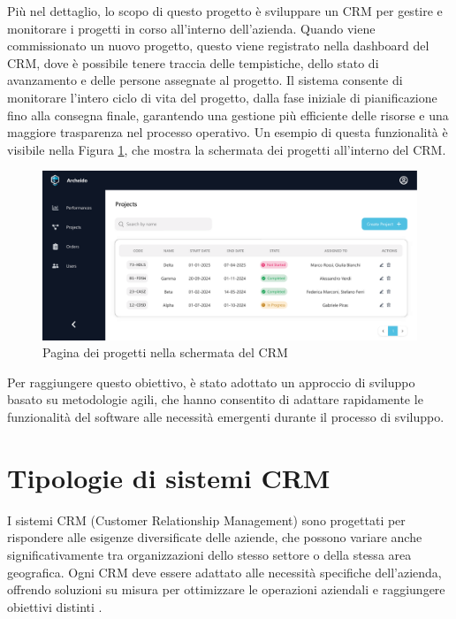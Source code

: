 \documentclass[target=bach,aauheader=,style=]{thud}
\begin{document}
\noindent  Più nel dettaglio, lo scopo di questo progetto è sviluppare un CRM per gestire e monitorare i progetti in corso all'interno dell'azienda. Quando viene commissionato un nuovo progetto, questo viene registrato nella dashboard del CRM, dove è possibile tenere traccia delle tempistiche, dello stato di avanzamento e delle persone assegnate al progetto. Il sistema consente di monitorare l'intero ciclo di vita del progetto, dalla fase iniziale di pianificazione fino alla consegna finale, garantendo una gestione più efficiente delle risorse e una maggiore trasparenza nel processo operativo. Un esempio di questa funzionalità è visibile nella Figura \ref{tabella_progetti_1}, che mostra la schermata dei progetti all'interno del CRM.

\begin{figure}[H]
    \centering
    \includegraphics[width=1\textwidth]{img/interfacce/table_project.pdf} 
    \caption{Pagina dei progetti nella schermata del CRM}
    \label{tabella_progetti_1}
\end{figure}

\noindent Per raggiungere questo obiettivo, è stato adottato un approccio di sviluppo basato su metodologie agili, che hanno consentito di adattare rapidamente le funzionalità del software alle necessità emergenti durante il processo di sviluppo.

\section{Tipologie di sistemi CRM}

I sistemi CRM (Customer Relationship Management) sono progettati per rispondere alle esigenze diversificate delle aziende, che possono variare anche significativamente tra organizzazioni dello stesso settore o della stessa area geografica. Ogni CRM deve essere adattato alle necessità specifiche dell'azienda, offrendo soluzioni su misura per ottimizzare le operazioni aziendali e raggiungere obiettivi distinti \cite{oracle_types_of_crm}.
\end{document}
